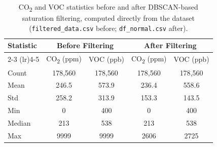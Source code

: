 \begin{table}[H]
\centering
\caption{CO\textsubscript{2} and VOC statistics before and after DBSCAN-based saturation filtering, computed directly from the dataset (\texttt{filtered\_data.csv} before; \texttt{df\_normal.csv} after).}
\label{table:dataset_stats}
\begin{tabular}{lcccc}
\toprule
\textbf{Statistic} & \multicolumn{2}{c}{\textbf{Before Filtering}} & \multicolumn{2}{c}{\textbf{After Filtering}} \\
\cmidrule(lr){2-3} \cmidrule(lr){4-5}
 & CO\textsubscript{2} (ppm) & VOC (ppb) & CO\textsubscript{2} (ppm) & VOC (ppb) \\
\midrule
Count  & 178{,}560 & 178{,}560 & 178{,}560 & 178{,}560 \\
Mean   & 246.5 & 573.9 & 236.4 & 558.6 \\
Std    & 258.2 & 313.9 & 153.3 & 143.5 \\
Min    & 0     & 400   & 0     & 400   \\
Median & 213   & 538   & 213   & 538   \\
Max    & 9999  & 9999  & 2606  & 2725  \\
\bottomrule
\end{tabular}
\end{table}
